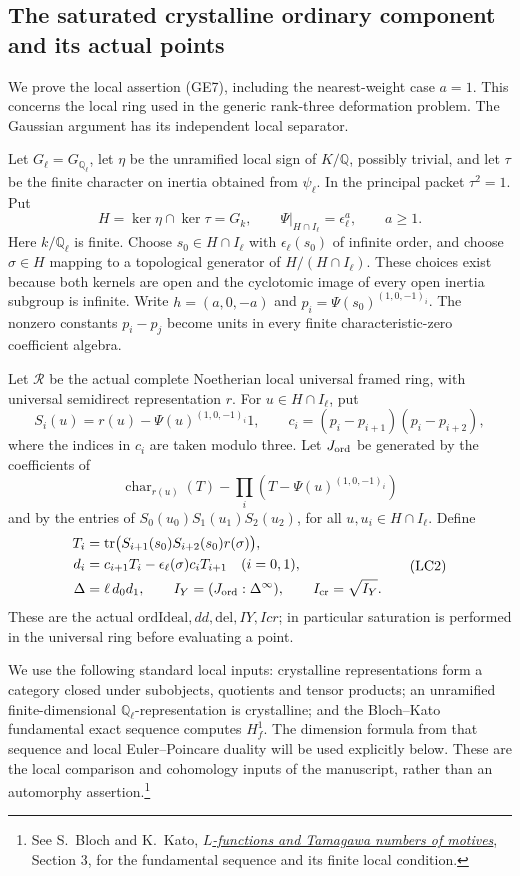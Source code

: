 \subsection{The saturated crystalline ordinary component and its actual points}
\label{subsec:sr-saturated-ordinary-crystalline}
We prove the local assertion (GE7), including the nearest-weight
case \(a=1\).
This concerns the local ring used in the generic rank-three
deformation problem.
The Gaussian argument has its independent local separator.

Let \(G_\ell=G_{\mathbb Q_\ell}\), let \(\eta\) be the
unramified local sign of \(K/\mathbb Q\), possibly trivial, and let \(\tau\) be the
finite character on inertia obtained from \(\psi_\ell\).
In the principal packet \(\tau^2=1\).
Put
\[
 H=\ker\eta\cap\ker\tau=G_k,\qquad
 \Psi|_{H\cap I_\ell}=\epsilon_\ell^a,\qquad a\ge1 .
 \tag{LC1}
\]
Here \(k/\mathbb Q_\ell\) is finite.
Choose \(s_0\in H\cap I_\ell\) with
\(\epsilon_\ell(s_0)\) of infinite order, and choose
\(\sigma\in H\) mapping to a topological generator of
\(H/(H\cap I_\ell)\).
These choices exist because both kernels are open and
the cyclotomic image of every open inertia subgroup is infinite.
Write \(h=(a,0,-a)\) and
\(p_i=\Psi(s_0)^{(1,0,-1)_i}\).
The nonzero constants \(p_i-p_j\) become units in every
finite characteristic-zero coefficient algebra.

Let \(\mathcal R\) be the actual complete Noetherian
local universal framed ring, with universal semidirect
representation \(r\).
For \(u\in H\cap I_\ell\), put
\[
 S_i(u)=r(u)-\Psi(u)^{(1,0,-1)_i}1,\qquad
 c_i=(p_i-p_{i+1})(p_i-p_{i+2}),
\]
where the indices in \(c_i\) are taken modulo three.
Let \(J_{\rm ord}\) be generated by the coefficients of
\[
 \operatorname{char}_{r(u)}(T)
       -\prod_i(T-\Psi(u)^{(1,0,-1)_i})
\]
and by the entries of
\(S_0(u_0)S_1(u_1)S_2(u_2)\), for all
\(u,u_i\in H\cap I_\ell\).
Define
\[
 \begin{split}
 T_i&=\operatorname{tr}
       \bigl(S_{i+1}(s_0)S_{i+2}(s_0)r(\sigma)\bigr),\\
 d_i&=c_{i+1}T_i-\epsilon_\ell(\sigma)c_iT_{i+1}
                       \quad(i=0,1),\\
 \Delta&=\ell\,d_0d_1,\qquad
 I_Y=(J_{\rm ord}:\Delta^\infty),\qquad
 I_{\rm cr}=\sqrt{I_Y}.
 \end{split}
 \tag{LC2}
\]
These are the actual \(\mathrm{ordIdeal},dd,\mathrm{del},IY,Icr\);
in particular saturation is performed in the universal ring
before evaluating a point.

We use the following standard local inputs:
crystalline representations form a category closed under
subobjects, quotients and tensor products; an unramified
finite-dimensional \(\mathbb Q_\ell\)-representation is crystalline;
and the Bloch--Kato fundamental exact sequence computes \(H^1_f\).
The dimension formula from that sequence and local
Euler--Poincare duality will be used explicitly below.
These are the local comparison and cohomology inputs of the
manuscript, rather than an automorphy assertion.\footnote{See
S.~Bloch and K.~Kato,
\href{https://math.stanford.edu/~conrad/BSDseminar/refs/BKTamagawa.pdf}
{\emph{\(L\)-functions and Tamagawa numbers of motives}},
Section 3, for the fundamental sequence and its finite local condition.}


